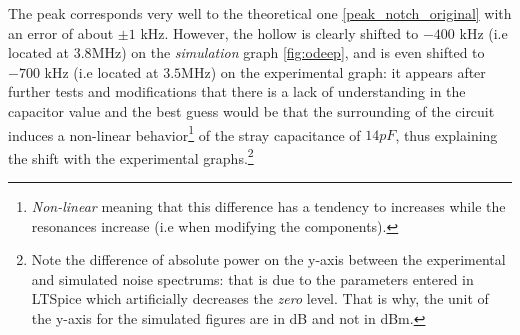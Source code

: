 \documentclass[11pt]{report}
\begin{document}
The peak corresponds very well to the theoretical one \eqref{peak_notch_original} with an error of about $\pm1$ kHz. However, the hollow is clearly shifted to $-400$ kHz (i.e located at $3.8$MHz) on the \textit{simulation} graph \ref{fig:odeep}, and is even shifted to $-700$ kHz (i.e located at $3.5$MHz) on the experimental graph: it appears after further tests and modifications that there is a lack of understanding in the capacitor value and the best guess would be that the surrounding of the circuit induces a non-linear behavior\footnote{\textit{Non-linear} meaning that this difference has a tendency to increases while the resonances increase (i.e when modifying the components).} of the stray capacitance of $14pF$, thus explaining the shift with the experimental graphs.\footnote{Note the difference of absolute power on the y-axis between the experimental and simulated noise spectrums: that is due to the parameters entered in LTSpice which artificially decreases the \textit{zero} level. That is why, the unit of the y-axis for the simulated figures are in dB and not in dBm.}
\end{document}
